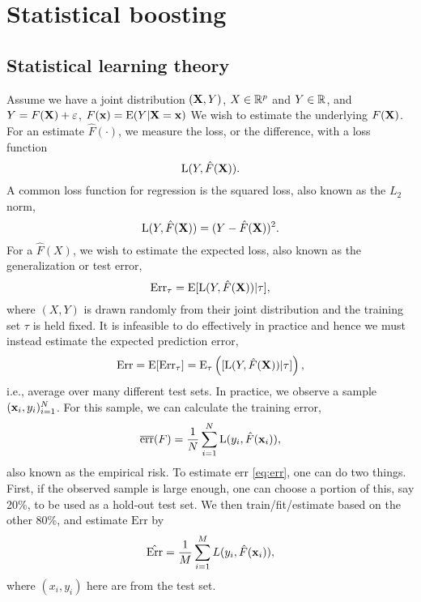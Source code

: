 \chapter{Statistical boosting}

\section{Statistical learning theory}\label{sec:learning-theory}
Assume we have a joint distribution $(\mathbf{X}, Y)$, $X\in\mathbb{R}^p$ and $Y\in\mathbb{R}$, and $Y=F(\mathbf{X})+\varepsilon$, $F(\mathbf{x})=\operatorname{E}(Y|\mathbf{X}=\mathbf{x})$ We wish to estimate the underlying $F(\mathbf{X})$. For an estimate $\hat{F}(\cdot)$, we measure the loss, or the difference, with a loss function
\begin{equation*}
    \operatorname{L}(Y, \hat{F}(\mathbf{X})).
\end{equation*}
A common loss function for regression is the squared loss, also known as the $L_2$ norm,
\begin{equation*}
    \operatorname{L}(Y, \hat{F}(\mathbf{X}))=(Y-\hat{F}(\mathbf{X}))^2.
\end{equation*}
For a $\hat{F}(X)$, we wish to estimate the expected loss, also known as the generalization or test error,
\begin{equation*}
    \text{Err}_{\tau}=\operatorname{E}[\operatorname{L}(Y,\hat{F}(\mathbf{X}))|\tau],
\end{equation*}
where $(X,Y)$ is drawn randomly from their joint distribution and the training set $\tau$ is held fixed. It is infeasible to do effectively in practice  and hence we must instead estimate the expected prediction error,
\begin{equation}\label{eq:err}
    \text{Err}=\operatorname{E}[\text{Err}_\tau]=\operatorname{E}_\tau\left([\operatorname{L}(Y,\hat{F}(\mathbf{X}))|\tau]\right),
\end{equation}
i.e., average over many different test sets.
In practice, we observe a sample $(\mathbf{x}_i,y_i)_{i=1}^N$. For this sample, we can calculate the training error,
\begin{equation}\label{eq:empirical-risk}
    \overline{\text{err}}(F)=\frac{1}{N}\sum_{i=1}^N\operatorname{L}(y_i, \hat{F}(\mathbf{x}_i)),
\end{equation}
also known as the empirical risk. To estimate $\text{err}$ \eqref{eq:err}, one can do two things. First, if the observed sample is large enough, one can choose a portion of this, say 20\%, to be used as a hold-out test set. We then train/fit/estimate based on the other 80\%, and estimate $\text{Err}$ by
\begin{equation*}
    \hat{\text{Err}}=\frac{1}{M}\sum_{i=1}^ML(y_i,\hat{F}(\mathbf{x}_i)),
\end{equation*}
where $(x_i,y_i)$ here are from the test set.

